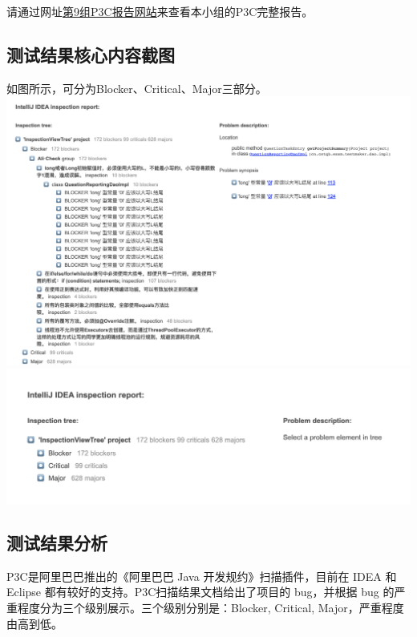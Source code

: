 \documentclass[hyperref, a4paper]{ctexart}
\begin{document}
请通过网址\href{https://straybird-atsh.github.io/SoftwareQA-Testing/P3CReport.html}{第9组P3C报告网站}来查看本小组的P3C完整报告。

\hypertarget{ux6d4bux8bd5ux7ed3ux679cux6838ux5fc3ux5185ux5bb9ux622aux56fe-1}{%
\subsection{测试结果核心内容截图}\label{ux6d4bux8bd5ux7ed3ux679cux6838ux5fc3ux5185ux5bb9ux622aux56fe-1}}

如图所示，可分为Blocker、Critical、Major三部分。
\includegraphics{screenshots/pic1.jpg}
\includegraphics{screenshots/pic2.jpg}

\hypertarget{ux6d4bux8bd5ux7ed3ux679cux5206ux6790-1}{%
\subsection{测试结果分析}\label{ux6d4bux8bd5ux7ed3ux679cux5206ux6790-1}}

P3C是阿里巴巴推出的《阿里巴巴 Java 开发规约》扫描插件，目前在 IDEA 和
Eclipse 都有较好的支持。P3C扫描结果文档给出了项目的 bug，并根据 bug
的严重程度分为三个级别展示。三个级别分别是：Blocker, Critical,
Major，严重程度由高到低。
\end{document}
